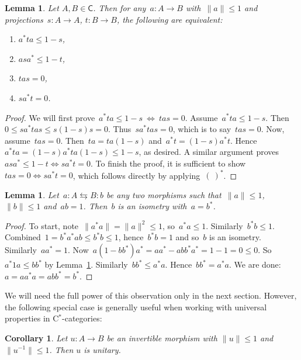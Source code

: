 \documentclass[reqno,T1,11pt]{amsproc}
\newcommand{\cat}[1]{\mathsf{#1}}		%
\theoremstyle{plain}
\newtheorem{lem}[thm]{Lemma}
\newtheorem{cor}[thm]{Corollary}
\theoremstyle{remark}
\numberwithin{equation}{section}
\begin{document}
\begin{lem}
	Let $A,B\in\cat{C}$. Then for any~$a\colon A \to B$ with~$\|a\| \leq 1$
    and projections~$s \colon A \to A$,
        $t\colon B\to B$,
	the following are equivalent:
\begin{enumerate}
\item $a^* t a \leq 1-s$,
\item $a s a^* \leq 1 - t$,
\item $tas = 0$,
\item $sa^* t = 0$.
\end{enumerate}
\label{contrapositionlemma}
\end{lem}
\begin{proof}
We will first prove~$a^*t a \leq 1-s \:\Leftrightarrow\: tas=0$.
    Assume~$a^* t a \leq 1-s$.
    Then~$0 \leq s a^* t a s \leq s (1-s) s = 0$.
    Thus~$s a^* t a s = 0$, which is to say~$tas = 0$.
    Now, assume~$tas = 0$.
    Then~$ta = ta(1-s)$ and~$a^*t = (1-s)a^* t$.
    Hence~$a^* ta = (1-s)a^*ta(1-s) \leq 1-s$, as desired.
A similar argument proves~$as a^* \leq 1-t \Leftrightarrow sa^*t=0$.
To finish the proof, it is sufficient to
        show~$tas=0 \Leftrightarrow sa^*t=0$, which follows directly
        by applying~$(\ )^*$.
\end{proof}

\begin{lem}
Let~$a \colon A \leftrightarrows B \colon b$ be any two morphisms
    such that~$\|a \| \leq 1$, $\| b\| \leq 1$ and~$ab=1$.
    Then~$b$ is an isometry with~$a=b^*$.
\label{isometrylemma}
\end{lem}
\begin{proof}
    To start, note~$\|a ^*a\| = \|a\|^2 \leq 1$, so~$a^*a \leq 1$.
    Similarly~$b^*b \leq 1$.
    Combined~$1 = b^*a^*ab \leq b^*b \leq 1$, hence~$b^*b=1$
        and so~$b$ is an isometry.
    Similarly~$aa^*=1$.
    Now~$a (1-bb^*) a^* = aa^* - abb^*a^* = 1-1=0 \leq 0$.
    So~$a^* 1 a \leq bb^*$ by Lemma~\ref{contrapositionlemma}.
    Similarly~$bb^* \leq a^*a$. Hence~$bb^*=a^*a$.
    We are done: $a = aa^*a=abb^*=b^*$.
\end{proof}

We will need the full power of this observation only in the next section. However, the following special case is generally useful when working with universal properties in C$^*$-categories:

\begin{cor}
Let $u : A \to B$ be an invertible morphism with $\| u \| \leq 1$ and $\| u^{-1} \| \leq 1$. Then $u$ is unitary.
\label{unitaries}
\end{cor}
\end{document}
